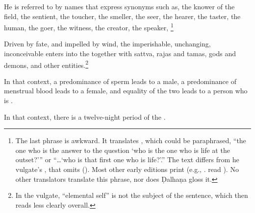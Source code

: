 \begin{translation}
He is referred to by names that express synonyms such as, the knower
of the field, the sentient, the toucher, the smeller, the seer, the
hearer, the taster, the human, the goer, the witness, the creator, the
speaker, \footnote{The last phrase is awkward.  It translates , which could be paraphrased, “the one who is the
    answer to the question `who is the one who is life at the outset?'” or
    “\ldots `who is that first one who is life?'.” The text differs from
    he vulgate's , that omits 
    (). Most other early editions print 
    (e.g., \cites[v.\,1, 320]{gupt-1835}[313]{bhat-1889}[v.\,3,
    30]{bhat-1908}[v.\,2, 635]{sarm-1895}. \citet[v.\,2, 65]{ghan-1936}
    read ). No other translators translate this
    phrase, nor does Ḍalhaṇa gloss it.} %





Driven by fate, and impelled by wind, the imperishable, unchanging,
inconceivable  enters into the
 together with sattva, rajas and tamas, gods
and demons, and other entities.\footnote{In the vulgate,
     “elemental self” is not the subject of the sentence,
    which then reads less clearly overall.}

\item [5]

In that context, a predominance of sperm leads to a male, a
predominance of menstrual blood leads to a female, and equality of the
two leads to a person who is .

\item[6ab]

In that context, there is a twelve-night period of the .

\item[3.3.6.1]


\end{translation}
